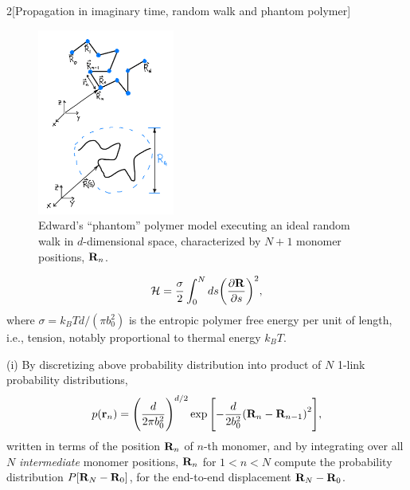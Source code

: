 \documentclass[12pt]{article}
\begin{document}
\begin{problem}{2}[Propagation in imaginary time, random walk and phantom
    polymer]
\begin{figure}
    \centering
    \includegraphics[width=0.4\textwidth]{p2b.png}
    \caption{Edward's ``phantom'' polymer model executing an ideal random walk
    in $d$-dimensional space, characterized by $N+1$ monomer positions,
$\vb{R}_n$.}
\label{fig:p2b}
\end{figure}

\begin{equation}
    \mathcal{H}=\frac\sigma2\int_0^Nds\qty(\frac{\partial\vb{R}}{\partial s})^2,  
\end{equation}
where $\sigma=k_BTd/(\pi b_0^2)$ is the entropic polymer free energy per unit of
length, i.e., tension, notably proportional to thermal energy $k_BT$.

\qquad(i) By discretizing above probability distribution into product of $N$
1-link probability distributions,
\begin{equation}
    p(\vb{r}_n)=\qty(\frac{d}{2\pi b_0^2})^{d/2}
    \exp\qty[-\frac{d}{2b_0^2}\qty(\vb{R}_n-\vb{R}_{n-1})^2],
\end{equation}
written in terms of the position $\vb{R}_n$ of $n$-th monomer, and by
integrating over all $N$ \textit{intermediate} monomer positions, $\vb{R}_n$ for
$1<n<N$ compute the probability distribution $P\qty[\vb{R}_N-\vb{R}_0]$, for the
end-to-end displacement $\vb{R}_N-\vb{R}_0$.


\end{problem}
\end{document}
